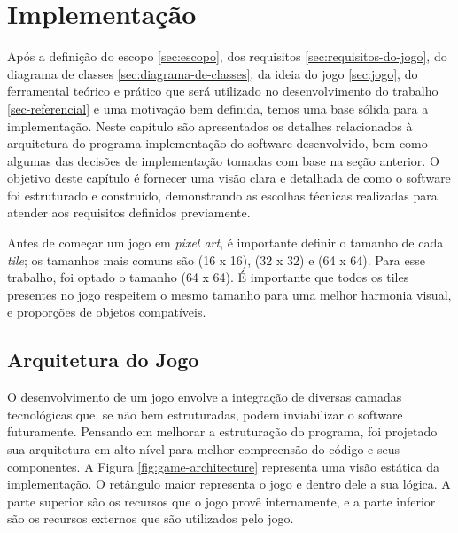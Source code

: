 \chapter{Implementação}
\label{sec-implementacao}

Após a definição do escopo \ref{sec:escopo}, dos requisitos \ref{sec:requisitos-do-jogo}, do diagrama de classes \ref{sec:diagrama-de-classes}, da ideia do jogo \ref{sec:jogo}, do ferramental teórico e prático que será utilizado no desenvolvimento do trabalho \ref{sec-referencial} e uma motivação bem definida, temos uma base sólida para a implementação. Neste capítulo são apresentados os detalhes relacionados à arquitetura do programa implementação do software desenvolvido, bem como algumas das decisões de implementação tomadas com base na seção anterior. O objetivo deste capítulo é fornecer uma visão clara e detalhada de como o software foi estruturado e construído, demonstrando as escolhas técnicas realizadas para atender aos requisitos definidos previamente.

Antes de começar um jogo em \textit{pixel art}, é importante definir o tamanho de cada \textit{tile}; os tamanhos mais comuns são (16 x 16), (32 x 32) e (64 x 64). Para esse trabalho, foi optado o tamanho (64 x 64). É importante que todos os tiles presentes no jogo respeitem o mesmo tamanho para uma melhor harmonia visual, e proporções de objetos compatíveis.

\section{Arquitetura do Jogo}
\label{sec:arquitetura-do-jogo}
O desenvolvimento de um jogo envolve a integração de diversas camadas tecnológicas que, se não bem estruturadas, podem inviabilizar o software futuramente. Pensando em melhorar a estruturação do programa, foi projetado sua arquitetura em alto nível para melhor compreensão do código e seus componentes. A Figura \ref{fig:game-architecture} representa uma visão estática da implementação. O retângulo maior representa o jogo e dentro dele a sua lógica. A parte superior são os recursos que o jogo provê internamente, e a parte inferior são os recursos externos que são utilizados pelo jogo.

